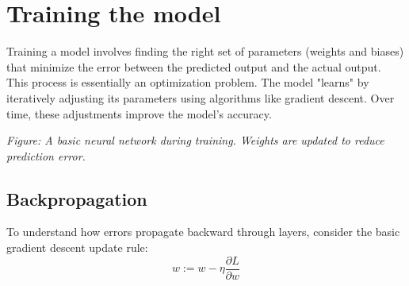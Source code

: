 \documentclass{book}
\begin{document}
\section{Training the model}
\noindent
Training a model involves finding the right set of parameters (weights and biases) that minimize the error between the predicted output and the actual output. This process is essentially an optimization problem. The model "learns" by iteratively adjusting its parameters using algorithms like gradient descent. Over time, these adjustments improve the model's accuracy.
\begin{center}

\vspace{0.5em}
\textit{Figure: A basic neural network during training. Weights are updated to reduce prediction error.}
\end{center}

\subsection{Backpropagation}
\vspace{0.5em}
\noindent
To understand how errors propagate backward through layers, consider the basic gradient descent update rule:
\begin{equation}
  w := w - \eta \frac{\partial L}{\partial w}
\end{equation}
\end{document}
